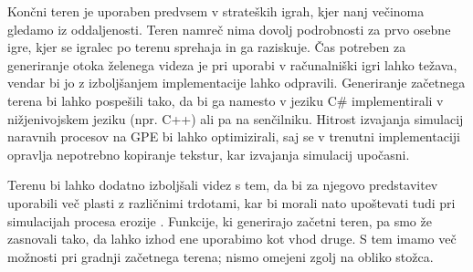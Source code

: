 \documentclass[9pt]{pnas-new}
\begin{document}
Končni teren je uporaben predvsem v strateških igrah, kjer nanj večinoma gledamo iz oddaljenosti. Teren namreč nima dovolj podrobnosti za prvo osebne igre, kjer se igralec po terenu sprehaja  in ga raziskuje. Čas potreben za generiranje otoka želenega videza je pri uporabi v računalniški igri
lahko težava, vendar bi jo z izboljšanjem implementacije lahko odpravili. Generiranje začetnega terena bi lahko pospešili tako, da bi ga namesto v jeziku C\# implementirali v nižjenivojskem jeziku (npr. C++) ali pa na senčilniku. Hitrost izvajanja simulacij naravnih procesov na GPE bi lahko optimizirali, saj se v trenutni implementaciji opravlja nepotrebno kopiranje tekstur, kar izvajanja simulacij upočasni. 

Terenu bi lahko dodatno izboljšali videz s tem, da bi za njegovo predstavitev uporabili več plasti z različnimi trdotami, kar bi morali nato upoštevati tudi pri simulacijah procesa erozije \cite{benevs_layered_08}. Funkcije, ki generirajo začetni teren, pa smo že zasnovali tako, da lahko izhod ene uporabimo kot vhod druge. S tem imamo več možnosti pri gradnji začetnega terena; nismo omejeni zgolj na obliko stožca. 

\showacknow %


\begin{multicols}{2}
\section*{\bibname}

\end{multicols}
\end{document}
